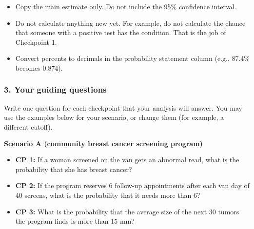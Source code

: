 \documentclass[
  letterpaper,
  DIV=11,
  numbers=noendperiod]{scrartcl}
\providecommand{\tightlist}{%
  \setlength{\itemsep}{0pt}\setlength{\parskip}{0pt}}
\begin{document}
\begin{tcolorbox}[enhanced jigsaw, arc=.35mm, bottomrule=.15mm, bottomtitle=1mm, breakable, colback=white, colbacktitle=quarto-callout-warning-color!10!white, colframe=quarto-callout-warning-color-frame, coltitle=black, left=2mm, leftrule=.75mm, opacityback=0, opacitybacktitle=0.6, rightrule=.15mm, title=\textcolor{quarto-callout-warning-color}{\faExclamationTriangle}\hspace{0.5em}{Record only what the source says}, titlerule=0mm, toprule=.15mm, toptitle=1mm]

\begin{itemize}
\tightlist
\item
  Copy the main estimate only. Do not include the 95\% confidence
  interval.
\item
  Do not calculate anything new yet. For example, do not calculate the
  chance that someone with a positive test has the condition. That is
  the job of Checkpoint 1.
\item
  Convert percents to decimals in the probability statement column
  (e.g., 87.4\% becomes 0.874).
\end{itemize}

\end{tcolorbox}

\subsubsection{3. Your guiding questions}\label{your-guiding-questions}

Write one question for each checkpoint that your analysis will answer.
You may use the examples below for your scenario, or change them (for
example, a different cutoff).

\textbf{Scenario A (community breast cancer screening program)}

\begin{itemize}
\tightlist
\item
  \textbf{CP 1:} If a woman screened on the van gets an abnormal read,
  what is the probability that she has breast cancer?
\item
  \textbf{CP 2:} If the program reserves 6 follow-up appointments after
  each van day of 40 screens, what is the probability that it needs more
  than 6?
\item
  \textbf{CP 3:} What is the probability that the average size of the
  next 30 tumors the program finds is more than 15 mm?
\end{itemize}
\end{document}
